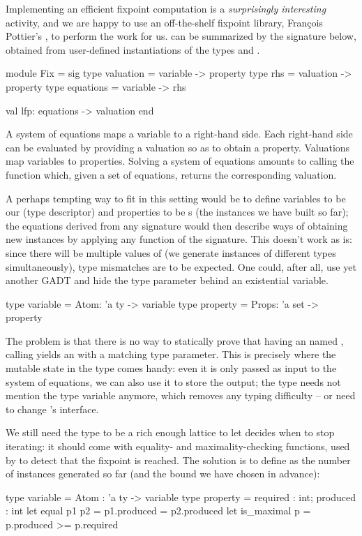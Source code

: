 Implementing an efficient fixpoint computation is a \emph{surprisingly
  interesting} activity, and we are happy to use an off-the-shelf
fixpoint library, François Pottier's %
, to perform the work for us.  can be summarized by
the signature below, obtained from user-defined instantiations of the
types  and .
%
\begin{ocamlcode}
module Fix = sig
  type valuation = variable -> property
  type rhs = valuation -> property
  type equations = variable -> rhs

  val lfp: equations -> valuation
end
\end{ocamlcode}
%
A system of equations maps a variable to a right-hand side.  Each
right-hand side can be evaluated by providing a valuation so as to
obtain a property. Valuations map variables to properties. Solving
a system of equations amounts to calling the  function
which, given a set of equations, returns the corresponding valuation.

A perhaps tempting way to fit in this setting would be to define
variables to be our  (type descriptor) and properties to
be s (the instances we have built so far); the equations
derived from any signature would then describe ways of obtaining new
instances by applying any function of the signature. This
doesn't work as is: since there will be multiple values of 
(we generate instances of different types simultaneously), type
mismatches are to be expected. One could, after all, use yet another
GADT and hide the  type parameter behind an existential
variable.
%
\begin{ocamlcode}
  type variable = Atom: 'a ty -> variable
  type property = Props: 'a set -> property
\end{ocamlcode}
%
The problem is that there is no way to statically prove that having an
 named , calling  yields an
 with a matching type parameter. This is precisely
where the mutable state in the  type comes handy: even it
is only passed as input to the system of equations, we can also use it
to store the output; the  type needs not mention the
type variable  anymore, which removes any typing
difficulty -- or need to change 's interface.

We still need the  type to be a rich enough lattice to
let  decides when to stop iterating: it should come with
equality- and maximality-checking functions, used by  to
detect that the fixpoint is reached. The solution is to define
 as the number of instances generated so far (and the
bound we have chosen in advance):
%
\begin{ocamlcode}
  type variable = Atom : 'a ty -> variable
  type property = { required : int; produced : int }
  let equal p1 p2 = p1.produced = p2.produced
  let is_maximal p = p.produced >= p.required
\end{ocamlcode}
%
